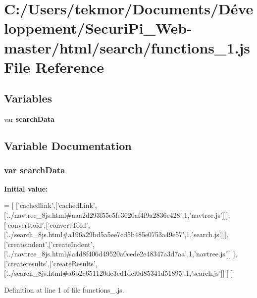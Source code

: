 \section{C\+:/\+Users/tekmor/\+Documents/\+Développement/\+Securi\+Pi\+\_\+\+Web-\/master/html/search/functions\+\_\+1.js File Reference}
\label{functions__1_8js}
\subsection*{Variables}
\begin{DoxyCompactItemize}
\item 
var {\bf search\+Data}
\end{DoxyCompactItemize}


\subsection{Variable Documentation}
\subsubsection[{search\+Data}]{\setlength{\rightskip}{0pt plus 5cm}var search\+Data}\label{functions__1_8js_ad01a7523f103d6242ef9b0451861231e}
{\bfseries Initial value\+:}
\begin{DoxyCode}
=
[
  [\textcolor{stringliteral}{'cachedlink'},[\textcolor{stringliteral}{'cachedLink'},[\textcolor{stringliteral}{'../navtree\_8js.html#aaa2d293f55e5fe3620af4f9a2836e428'},1,\textcolor{stringliteral}{'navtree.js'}]]],
  [\textcolor{stringliteral}{'converttoid'},[\textcolor{stringliteral}{'convertToId'},[\textcolor{stringliteral}{'../search\_8js.html#a196a29bd5a5ee7cd5b485e0753a49e57'},1,\textcolor{stringliteral}{'search.js'}]]],
  [\textcolor{stringliteral}{'createindent'},[\textcolor{stringliteral}{'createIndent'},[\textcolor{stringliteral}{'../navtree\_8js.html#a4d8f406d49520a0cede2e48347a3d7aa'},1,\textcolor{stringliteral}{'navtree.js'}]]
      ],
  [\textcolor{stringliteral}{'createresults'},[\textcolor{stringliteral}{'createResults'},[\textcolor{stringliteral}{'../search\_8js.html#a6b2c651120de3ed1dcf0d85341d51895'},1,\textcolor{stringliteral}{'search.js'}]]
      ]
]
\end{DoxyCode}


Definition at line 1 of file functions\+\_.\+js.

